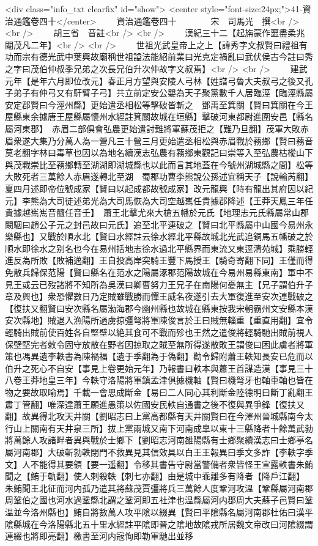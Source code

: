 <div class="info_txt clearfix" id="show">
<center style="font-size:24px;">41-資治通鑑卷四十</center>
  　　資治通鑑卷四十　　　　宋　司馬光　撰<br />
<br />
　　胡三省　音註<br />
<br />
　　漢紀三十二【起旃蒙作噩盡柔兆閹茂凡二年】<br />
<br />
　　世祖光武皇帝上之上【諱秀字文叔賢曰禮祖有功而宗有德光武中葉興故廟稱世祖謚法能紹前業曰光克定禍亂曰武伏侯古今註曰秀之字曰茂伯仲叔季兄弟之次長兄伯升次仲故字文叔焉】<br />
<br />
　　建武元年【是年六月即位改元】春正月方望與安陵人弓林【姓譜弓魯大夫叔弓之後又孔子弟子有仲弓又有馯臂子弓】共立前定安公嬰為天子聚黨數千人居臨涇【臨涇縣屬安定郡賢曰今涇州縣】更始遣丞相松等擊破皆斬之　鄧禹至箕關【賢曰箕關在今王屋縣東余據唐王屋縣屬懷州水經註箕關故城在垣縣】擊破河東都尉進圍安邑【縣名屬河東郡】　赤眉二部俱會弘農更始遣討難將軍蘇茂拒之【難乃旦翻】茂軍大敗赤眉衆遂大集乃分萬人為一營凡三十營三月更始遣丞相松與赤眉戰於蓩鄉【賢曰蓩音莫老翻字林曰毒草也因以為地名續漢志弘農有蓩鄉東觀記曰崇等入至弘農枯樅山下與茂戰崇比至蓩鄉轉至湖湖即湖城縣也以此而言其地蓋在今虢州湖城縣之間】松等大敗死者三萬餘人赤眉遂轉北至湖　蜀郡功曹李熊說公孫述宜稱天子【說輸芮翻】夏四月述即帝位號成家【賢曰以起成都故號成家】改元龍興【時有龍出其府因以紀元】李熊為大司徒述弟光為大司馬恢為大司空越嶲任貴據郡降述【王莽天鳳三年任貴據越嶲嶲音髓任音壬】　蕭王北擊尤來大槍五幡於元氏【地理志元氏縣屬常山郡闞駰曰趙公子元之封邑故曰元氏】追至北平連破之【賢曰北平縣屬中山國今易州永樂縣也】又戰於順水北【賢曰水經註云徐水經北平縣故城北光武追銅馬五幡破之於順水即徐水之别名也今在易州括地志徐水過北平縣界而東流又東逕清苑城】乘勝輕進反為所敗【敗補邁翻】王自投高岸突騎王豐下馬授王【騎奇寄翻下同】王僅而得免散兵歸保范陽【賢曰縣名在范水之陽屬涿郡范陽故城在今易州易縣東南】軍中不見王或云已歿諸將不知所為吳漢曰卿曹努力王兄子在南陽何憂無主【兄子謂伯升子章及興也】衆恐懼數日乃定賊雖戰勝而憚王威名夜遂引去大軍復進至安次連戰破之【復扶又翻賢曰安次縣名屬渤海郡今幽州縣也故城在縣東按我宋朝霸州文安縣本漢安次縣地】賊退入漁陽所過虜掠彊弩將軍陳俊言於王曰賊無輜重【重直用翻】宜令輕騎出賊前使百姓各自堅壁以絶其食可不戰而殄也王然之遣俊將輕騎馳出賊前視人保壁堅完者敕令固守放散在野者因掠取之賊至無所得遂散敗王謂俊曰困此虜者將軍策也馮異遺李軼書為陳禍福【遺于季翻為于偽翻】勸令歸附蕭王軼知長安已危而以伯升之死心不自安【事見上卷更始元年】乃報書曰軼本與蕭王首謀造漢【事見三十八卷王莽地皇三年】今軼守洛陽將軍鎮孟津俱據機軸【賢曰機弩牙也軸車軸也皆在物之要故取喻焉】千載一會思成斷金【易曰二人同心其利斷金陸德明曰斷丁亂翻王肅丁管翻】唯深達蕭王願進愚策以佐國安民軼自通書之後不復與異爭鋒【復扶又翻】故異得北攻天井關【劉昭志曰上黨高都縣有天井關賢曰在今澤州晉城縣南今太行山上關南有天井泉三所】拔上黨兩城又南下河南成臯以東十三縣降者十餘萬武勃將萬餘人攻諸畔者異與戰於士鄉下【劉昭志河南雒陽縣有士鄉聚續漢志曰士鄉亭名屬河南郡】大破斬勃軼閉門不救異見其信效具以白王王報異曰季文多詐【李軼字季文】人不能得其要領【要一遥翻】令移其書告守尉當警備者衆皆怪王宣露軼書朱鮪聞之【鮪于軌翻】使人刺殺軼【刺七亦翻】由是城中乖離多有降者【降戶江翻】　朱鮪聞王北征而河内孤乃遣其將蘇茂賈彊將兵三萬餘人度鞏河攻溫【鞏縣屬河南郡周鞏伯之國也河水過鞏縣北謂之鞏河即五社津也温縣屬河内郡周大夫蘇子邑賢曰鞏温並今洛州縣也】鮪自將數萬人攻平隂以綴異【賢曰平隂縣名屬河南郡杜佑曰漢平隂縣城在今洛陽縣北五十里水經註平隂即晉之隂地故隂戎所居魏文帝改曰河隂綴謂連綴也將即亮翻】檄書至河内宼恂即勒軍馳出並移